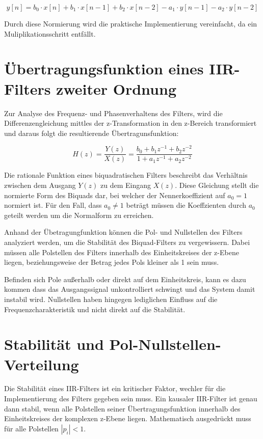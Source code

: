 \documentclass[
  ngerman,
  letterpaper,
  DIV=11]{scrreprt}
\begin{document}
\[
y[n] = b_0 \cdot x[n] + b_1 \cdot x[n - 1] + b_2 \cdot x[n - 2] - a_1 \cdot y[n - 1] - a_2 \cdot y[n - 2]
\]

Durch diese Normierung wird die praktische Implementierung vereinfacht,
da ein Muliplikationsschritt entfällt.

\section{Übertragungsfunktion eines IIR-Filters zweiter
Ordnung}\label{uxfcbertragungsfunktion-eines-iir-filters-zweiter-ordnung}

Zur Analyse des Frequenz- und Phasenverhaltens des Filters, wird die
Differenzengleichung mittles der z-Transformation in den z-Bereich
transformiert und daraus folgt die resultierende Übertragunsfunktion:

\[
H(z) = \frac{Y(z)}{X(z)} = \frac{b_0 + b_1 z^{-1} + b_2 z^{-2}}{1 + a_1 z^{-1} + a_2 z^{-2}}
\]

Die rationale Funktion eines biquadratischen Filters beschreibt das
Verhältnis zwischen dem Ausgang \(Y(z)\) zu dem Eingang \(X(z)\). Diese
Gleichung stellt die normierte Form des Biquads dar, bei welcher der
Nennerkoeffizient auf \(a_0 = 1\) normiert ist. Für den Fall, dass
\(a_0 ≠ 1\) beträgt müssen die Koeffzienten durch \(a_0\) geteilt werden
um die Normalform zu erreichen.

Anhand der Übetragungfunktion können die Pol- und Nullstellen des
Filters analyziert werden, um die Stabilität des Biquad-Filters zu
vergewissern. Dabei müssen alle Polstellen des Filters innerhalb des
Einheitskreises der z-Ebene liegen, beziehungsweise der Betrag jedes
Pols kleiner als 1 sein muss.

Befinden sich Pole außerhalb oder direkt auf dem Einheitskreis, kann es
dazu kommen dass das Ausgangssignal unkontrolliert schwingt und das
System damit instabil wird. Nullstellen haben hingegen lediglichen
Einfluss auf die Frequenzcharakteristik und nicht direkt auf die
Stabilität.

\section{Stabilität und
Pol-Nullstellen-Verteilung}\label{stabilituxe4t-und-pol-nullstellen-verteilung}

Die Stabilität eines IIR-Filters ist ein kritischer Faktor, wechler für
die Implementierung des Filters gegeben sein muss. Ein kausaler
IIR-Filter ist genau dann stabil, wenn alle Polstellen seiner
Übertragungsfunktion innerhalb des Einheitskreises der komplexen z-Ebene
liegen. Mathematisch ausgedrückt muss für alle Polstellen \(|p_i| < 1\).
\end{document}
